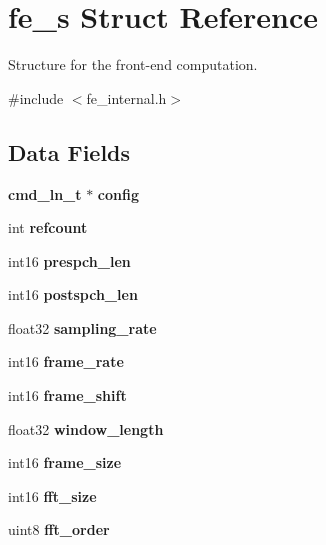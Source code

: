 \section{fe\-\_\-s Struct Reference}
\label{structfe__s}


Structure for the front-\/end computation.  




{\ttfamily \#include $<$fe\-\_\-internal.\-h$>$}

\subsection*{Data Fields}
\begin{DoxyCompactItemize}
\item 
{\bf cmd\-\_\-ln\-\_\-t} $\ast$ {\bfseries config}\label{structfe__s_abe27cd07861a2f0042f5a83f3371d0fb}

\item 
int {\bfseries refcount}\label{structfe__s_a4cdf2f8b372cfddb38a48dd770450af9}

\item 
int16 {\bfseries prespch\-\_\-len}\label{structfe__s_ac092f217405d5d273db71888bdd3930e}

\item 
int16 {\bfseries postspch\-\_\-len}\label{structfe__s_a3550f23ec53a567b1ce21923829b20b6}

\item 
float32 {\bfseries sampling\-\_\-rate}\label{structfe__s_af79879861c60083c1c0135c380bfe8e2}

\item 
int16 {\bfseries frame\-\_\-rate}\label{structfe__s_a23ca679cec8c0643dd1fa32b4e925f00}

\item 
int16 {\bfseries frame\-\_\-shift}\label{structfe__s_a62b189505f084007c3799faf3836b118}

\item 
float32 {\bfseries window\-\_\-length}\label{structfe__s_ae652f41503dd7b853bff8de89340703d}

\item 
int16 {\bfseries frame\-\_\-size}\label{structfe__s_a72b5838a48f3a10c8ba3917d245093d0}

\item 
int16 {\bfseries fft\-\_\-size}\label{structfe__s_a466b997c1f544043fb3ab6f2f89e97e7}

\item 
uint8 {\bfseries fft\-\_\-order}\label{structfe__s_a3783552280c06207510cbe576a76d1d9}


\end{DoxyCompactItemize}
